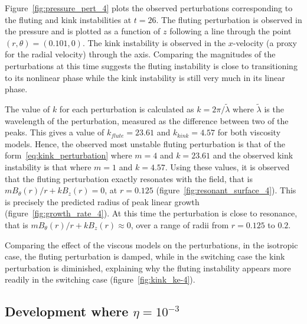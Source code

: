Figure~\ref{fig:pressure_pert_4} plots the observed perturbations corresponding to the fluting and kink instabilities at $t=26$. The fluting perturbation is observed in the pressure and is plotted as a function of $z$ following a line through the point $(r, \theta) = (0.101, 0)$. The kink instability is observed in the $x$-velocity (a proxy for the radial velocity) through the axis. Comparing the magnitudes of the perturbations at this time suggests the fluting instability is close to transitioning to its nonlinear phase while the kink instability is still very much in its linear phase.

The value of $k$ for each perturbation is calculated as $k = 2\pi/\tilde{\lambda}$ where $\tilde{\lambda}$ is the wavelength of the perturbation, measured as the difference between two of the peaks. This gives a value of $k_{flute}=23.61$ and $k_{kink}=4.57$ for both viscosity models. Hence, the observed most unstable fluting perturbation is that of the form~\eqref{eq:kink_perturbation} where $m=4$ and $k=23.61$ and the observed kink instability is that where $m=1$ and $k=4.57$. Using these values, it is observed that the fluting perturbation exactly resonates with the field, that is $m B_{\theta}(r)/r + kB_z(r) = 0$, at $r=0.125$ (figure~\ref{fig:resonant_surface_4}). This is precisely the predicted radius of peak linear growth (figure~\ref{fig:growth_rate_4}). At this time the perturbation is close to resonance, that is $m B_{\theta}(r)/r + kB_z(r) \approx 0$, over a range of radii from $r=0.125$ to $0.2$.

Comparing the effect of the viscous models on the perturbations, in the isotropic case, the fluting perturbation is damped, while in the switching case the kink perturbation is diminished, explaining why the fluting instability appears more readily in the switching case (figure~\ref{fig:kink_ke-4}).

\subsection{Development where $\eta=10^{-3}$}


